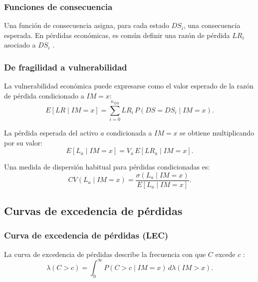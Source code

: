 \subsubsection{Funciones de consecuencia}

Una función de consecuencia asigna, para cada estado \(DS_i\), una consecuencia esperada. En pérdidas económicas, es común definir una razón de pérdida \(LR_i\) asociado a \(DS_i\) \cite{FEMA_P58_2018_V1}.

\subsubsection{De fragilidad a vulnerabilidad}

La vulnerabilidad económica puede expresarse como el valor esperado de la razón de pérdida condicionado a \(IM=x\):
\begin{equation}
E[LR \mid IM = x] = \sum_{i=0}^{n_{DS}} LR_i \, P(DS = DS_i \mid IM = x).
\label{eq:expected_loss_ratio_from_ds}
\end{equation}

La pérdida esperada del activo \(a\) condicionada a \(IM=x\) se obtiene multiplicando por su valor:
\begin{equation}
E[L_a \mid IM = x] = V_a \, E[LR_a \mid IM = x].
\label{eq:expected_loss_asset}
\end{equation}

Una medida de dispersión habitual para pérdidas condicionadas es:
\begin{equation}
CV(L_a \mid IM=x) = \frac{\sigma(L_a \mid IM=x)}{E[L_a \mid IM=x]}.
\label{eq:cv_loss}
\end{equation}

\subsection{Curvas de excedencia de pérdidas}

\subsubsection{Curva de excedencia de pérdidas (LEC)}

La curva de excedencia de pérdidas describe la frecuencia con que \(C\) excede \(c\) \cite{BakerBradleyStafford2021}:
\begin{equation}
\lambda(C > c) = \int_{0}^{\infty} P(C > c \mid IM = x)\, d\lambda(IM > x).
\label{eq:loss_exceedance_curve_v2}
\end{equation}


